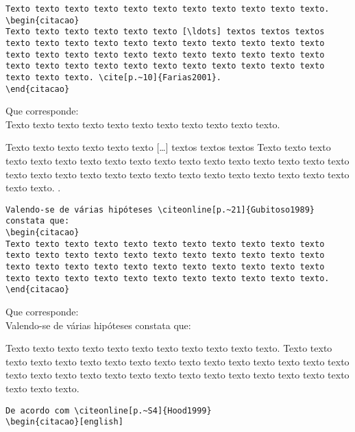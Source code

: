 \begin{alineas} 

\item 
\begin{verbatim}
Texto texto texto texto texto texto texto texto texto texto texto. 
\begin{citacao}
Texto texto texto texto texto texto [\ldots] textos textos textos
texto texto texto texto texto texto texto texto texto texto texto 
texto texto texto texto texto texto texto texto texto texto texto 
texto texto texto texto texto texto texto texto texto texto texto
texto texto texto. \cite[p.~10]{Farias2001}.
\end{citacao}
\end{verbatim}
Que corresponde: \\
Texto texto texto texto texto texto texto texto texto texto texto. 
\begin{citacao}
Texto texto texto texto texto texto  [\ldots] textos textos textos Texto texto texto texto texto texto texto texto texto texto texto texto texto texto texto texto texto texto texto texto texto texto texto texto texto texto texto texto texto  texto texto texto texto. \cite[p.~10]{Farias2001}.
\end{citacao}	
\item
\begin{verbatim}
Valendo-se de várias hipóteses \citeonline[p.~21]{Gubitoso1989} 
constata que: 
\begin{citacao}
Texto texto texto texto texto texto texto texto texto texto texto
texto texto texto texto texto texto texto texto texto texto texto 
texto texto texto texto texto texto texto texto texto texto texto 
texto texto texto texto texto texto texto texto texto texto texto.
\end{citacao}
\end{verbatim}
Que corresponde: \\
Valendo-se de várias hipóteses  constata que:
\begin{citacao}
Texto texto texto texto texto texto texto texto texto texto texto. Texto texto texto texto texto texto texto texto texto texto texto texto texto texto texto texto texto texto texto texto texto texto texto texto texto texto texto texto texto  texto texto texto texto.\\
\end{citacao}
\item
\begin{verbatim}
De acordo com \citeonline[p.~S4]{Hood1999}
\begin{citacao}[english]

\end{verbatim}
\end{alineas}
